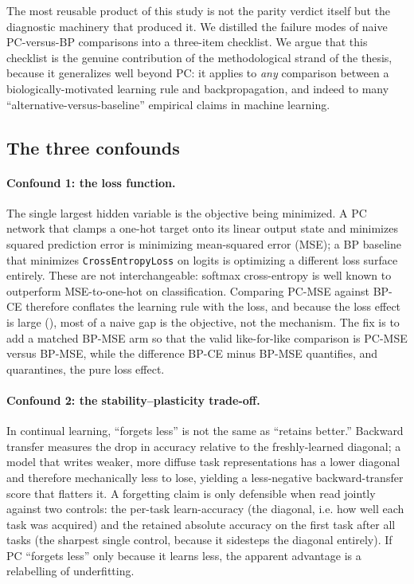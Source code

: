The most reusable product of this study is not the parity verdict itself but the diagnostic
machinery that produced it. We distilled the failure modes of naive PC-versus-BP comparisons into a
three-item checklist. We argue that this checklist is the genuine contribution of the methodological
strand of the thesis, because it generalizes well beyond PC: it applies to \emph{any} comparison
between a biologically-motivated learning rule and backpropagation, and indeed to many
``alternative-versus-baseline'' empirical claims in machine learning.

\subsection{The three confounds}

\paragraph{Confound 1: the loss function.}
The single largest hidden variable is the objective being minimized. A PC network that clamps a
one-hot target onto its linear output state and minimizes squared prediction error is minimizing
mean-squared error (MSE); a BP baseline that minimizes \texttt{CrossEntropyLoss} on logits is
optimizing a different loss surface entirely. These are not interchangeable: softmax cross-entropy
is well known to outperform MSE-to-one-hot on classification. Comparing PC-MSE against BP-CE
therefore conflates the learning rule with the loss, and because the loss effect is large
(), most of a naive gap is the objective, not the mechanism. The fix is to add a
matched BP-MSE arm so that the valid like-for-like comparison is PC-MSE versus BP-MSE, while the
difference BP-CE minus BP-MSE quantifies, and quarantines, the pure loss effect.

\paragraph{Confound 2: the stability--plasticity trade-off.}
In continual learning, ``forgets less'' is not the same as ``retains better.'' Backward transfer
measures the drop in accuracy relative to the freshly-learned diagonal; a model that writes weaker,
more diffuse task representations has a lower diagonal and therefore mechanically less to lose,
yielding a less-negative backward-transfer score that flatters it. A forgetting claim is only
defensible when read jointly against two controls: the per-task learn-accuracy (the diagonal, i.e.
how well each task was acquired) and the retained absolute accuracy on the first task after all
tasks (the sharpest single control, because it sidesteps the diagonal entirely). If PC ``forgets
less'' only because it learns less, the apparent advantage is a relabelling of underfitting.

